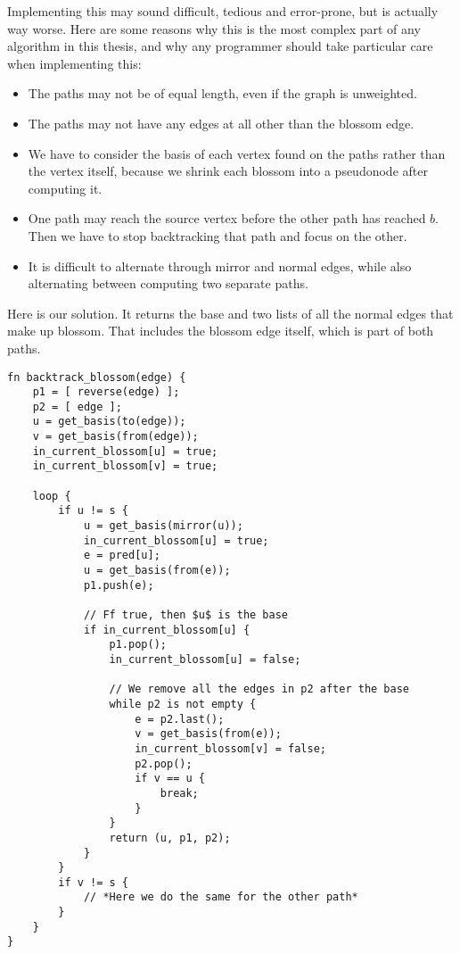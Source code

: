 Implementing this may sound difficult, tedious and error-prone, but is actually way worse. Here are some reasons why this is the most complex part of any algorithm in this thesis, and why any programmer should take particular care when implementing this:
\begin{itemize}
    \item The paths may not be of equal length, even if the graph is unweighted.
    \item The paths may not have any edges at all other than the blossom edge.
    \item We have to consider the basis of each vertex found on the paths rather than the vertex itself, because we shrink each blossom into a pseudonode after computing it.
    \item One path may reach the source vertex before the other path has reached $b$. Then we have to stop backtracking that path and focus on the other.
    \item It is difficult to alternate through mirror and normal edges, while also alternating between computing two separate paths.
\end{itemize}

Here is our solution. It returns the base and two lists of all the normal edges that make up blossom. That includes the blossom edge itself, which is part of both paths.
\begin{lstlisting}[caption={Backtrack blossom},label=Listing,mathescape=true]
fn backtrack_blossom(edge) {
    p1 = [ reverse(edge) ];
    p2 = [ edge ];
    u = get_basis(to(edge));
    v = get_basis(from(edge));
    in_current_blossom[u] = true;
    in_current_blossom[v] = true;

    loop {
        if u != s {
            u = get_basis(mirror(u));
            in_current_blossom[u] = true;
            e = pred[u];
            u = get_basis(from(e));
            p1.push(e);

            // Ff true, then $u$ is the base
            if in_current_blossom[u] { 
                p1.pop();
                in_current_blossom[u] = false;

                // We remove all the edges in p2 after the base
                while p2 is not empty {
                    e = p2.last();
                    v = get_basis(from(e));
                    in_current_blossom[v] = false;
                    p2.pop();
                    if v == u {
                        break;
                    }
                }
                return (u, p1, p2);
            }
        }
        if v != s {
            // *Here we do the same for the other path*
        }
    }
}
\end{lstlisting}

